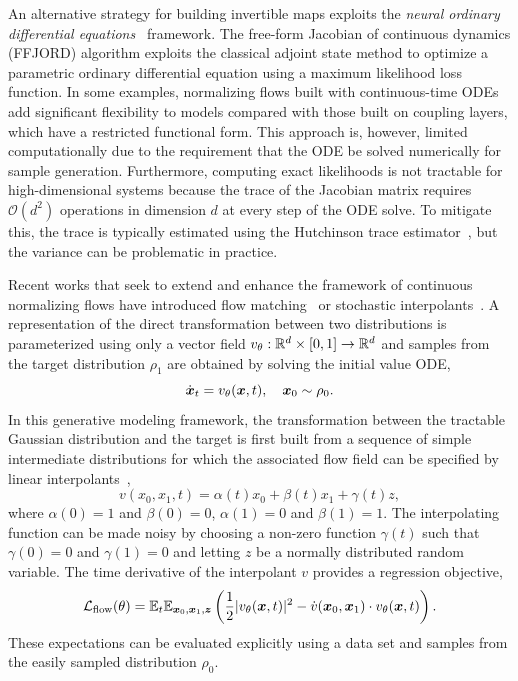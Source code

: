 \documentclass[11pt]{article}
\begin{document}
An alternative strategy for building invertible maps exploits the \emph{neural ordinary differential equations}~\cite{chen_neural_2018} framework.
The free-form Jacobian of continuous dynamics (FFJORD) algorithm exploits the classical adjoint state method to optimize a parametric ordinary differential equation using a maximum likelihood loss function. 
In some examples, normalizing flows built with continuous-time ODEs add significant flexibility to models compared with those built on coupling layers, which have a restricted functional form.
This approach is, however, limited computationally due to the requirement that the ODE be solved numerically for sample generation. 
Furthermore, computing exact likelihoods is not tractable for high-dimensional systems because the trace of the Jacobian matrix requires $\mathcal{O}(d^2)$ operations in dimension $d$ at every step of the ODE solve.
To mitigate this, the trace is typically estimated using the Hutchinson trace estimator~\cite{hutchinson_stochastic_1989}, but the variance can be problematic in practice. 

Recent works that seek to extend and enhance the framework of continuous normalizing flows have introduced flow matching~\cite{peluchetti_non-denoising_2022,peluchetti_diffusion_2023,lipman_flow_2022} or stochastic interpolants~\cite{albergo_building_2022, albergo_stochastic_2023}.
A representation of the direct transformation between two distributions is parameterized using only a vector field $v_{\theta}: \mathbb{R}^d\times[0,1]\to \mathbb{R}^d$ and samples from the target distribution $\rho_1$ are obtained by solving the initial value ODE,
\begin{equation}
    \dot {\boldsymbol{x}}_t = v_{\theta}(\boldsymbol{x},t), \quad \boldsymbol{x}_0 \sim \rho_0.
\end{equation}
In this generative modeling framework, the transformation between the tractable Gaussian distribution and the target is first built from a sequence of simple intermediate distributions for which the associated flow field can be specified by linear interpolants~\cite{lipman_flow_2022, albergo_building_2022}, 
\begin{equation}
    v(x_0, x_1, t) = \alpha(t) x_0 + \beta(t) x_1 + \gamma(t) z,
\end{equation}
where $\alpha(0)=1$ and $\beta(0)=0$, $\alpha(1)=0$ and $\beta(1)=1$.
The interpolating function can be made noisy by choosing a non-zero function $\gamma(t)$ such that $\gamma(0)=0$ and $\gamma(1)=0$ and letting $z$ be a normally distributed random variable.
The time derivative of the interpolant $v$ provides a regression objective, 
\begin{equation}
    \mathcal{L}_{\rm flow}(\theta) = \mathbb{E}_{t} \mathbb{E}_{\boldsymbol{x}_0, \boldsymbol{x}_1, \boldsymbol{z}} \left( \frac12 |v_\theta(\boldsymbol{x}, t)|^2 - \dot v(\boldsymbol{x}_0, \boldsymbol{x}_1) \cdot v_{\theta}(\boldsymbol{x}, t) \right).
\end{equation}
These expectations can be evaluated explicitly using a data set and samples from the easily sampled distribution $\rho_0$.
\end{document}
